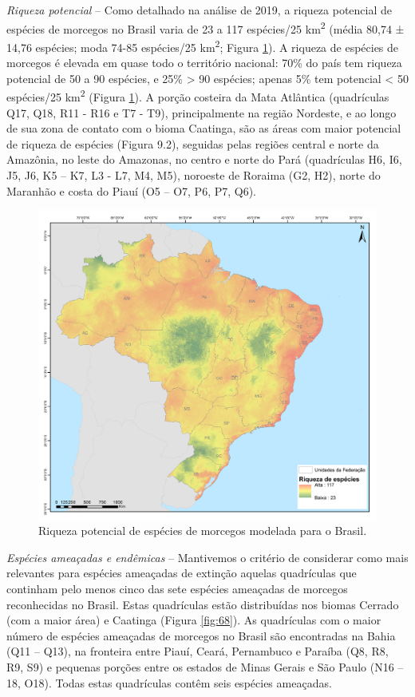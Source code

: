 \documentclass[
  oneside]{scrbook}
\begin{document}
\emph{Riqueza potencial} -- Como detalhado na análise de 2019, a riqueza potencial de espécies de morcegos no Brasil varia de 23 a 117 espécies/25 km\textsuperscript{2} (média 80,74 ± 14,76 espécies; moda 74-85 espécies/25 km\textsuperscript{2}; Figura \ref{fig:67}). A riqueza de espécies de morcegos é elevada em quase todo o território nacional: 70\% do país tem riqueza potencial de 50 a 90 espécies, e 25\% \textgreater{} 90 espécies; apenas 5\% tem potencial \textless{} 50 espécies/25 km\textsuperscript{2} (Figura \ref{fig:67}). A porção costeira da Mata Atlântica (quadrículas Q17, Q18, R11 - R16 e T7 - T9), principalmente na região Nordeste, e ao longo de sua zona de contato com o bioma Caatinga, são as áreas com maior potencial de riqueza de espécies (Figura 9.2), seguidas pelas regiões central e norte da Amazônia, no leste do Amazonas, no centro e norte do Pará (quadrículas H6, I6, J5, J6, K5 -- K7, L3 - L7, M4, M5), noroeste de Roraima (G2, H2), norte do Maranhão e costa do Piauí (O5 -- O7, P6, P7, Q6).

\begin{figure}[H]

{\centering \includegraphics[width=0.75\linewidth]{imagens/cap09/Figura_9.1} 

}

\caption{Riqueza potencial de espécies de morcegos modelada para o Brasil.}\label{fig:67}
\end{figure}

\emph{Espécies ameaçadas e endêmicas} -- Mantivemos o critério de considerar como mais relevantes para espécies ameaçadas de extinção aquelas quadrículas que continham pelo menos cinco das sete espécies ameaçadas de morcegos reconhecidas no Brasil. Estas quadrículas estão distribuídas nos biomas Cerrado (com a maior área) e Caatinga (Figura \ref{fig:68}). As quadrículas com o maior número de espécies ameaçadas de morcegos no Brasil são encontradas na Bahia (Q11 -- Q13), na fronteira entre Piauí, Ceará, Pernambuco e Paraíba (Q8, R8, R9, S9) e pequenas porções entre os estados de Minas Gerais e São Paulo (N16 -- 18, O18). Todas estas quadrículas contêm seis espécies ameaçadas.
\end{document}
